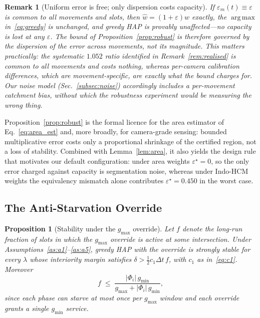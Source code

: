 \documentclass[journal]{IEEEtran}
\newtheorem{proposition}{Proposition}
\newtheorem{remark}{Remark}
\DeclareMathOperator*{\argmax}{arg\,max}
\begin{document}
\begin{remark}[Uniform error is free; only dispersion costs capacity]
\label{rem:dispersion}
If $\varepsilon_m(t) \equiv \varepsilon$ is common to all movements and
slots, then $\hat{w} = (1+\varepsilon) w$ exactly, the $\argmax$
in~\eqref{eq:greedy} is unchanged, and greedy HAP is
\emph{provably unaffected}---no capacity is lost at any $\varepsilon$.
The bound of Proposition~\ref{prop:robust} is therefore governed by the
\emph{dispersion} of the error across movements, not its magnitude. This
matters practically: the systematic $1.052$ ratio identified in
Remark~\ref{rem:realised} is common to all movements and costs nothing,
whereas per-camera calibration differences, which are movement-specific,
are exactly what the bound charges for. Our noise model
(Sec.~\ref{subsec:noise}) accordingly includes a per-movement catchment
bias, without which the robustness experiment would be measuring the
wrong thing.
\end{remark}

Proposition~\ref{prop:robust} is the formal licence for the area
estimator of Eq.~\eqref{eq:area_est} and, more broadly, for camera-grade
sensing: bounded multiplicative error costs only a proportional shrinkage
of the certified region, not a loss of stability. Combined with
Lemma~\ref{lem:area}, it also yields the design rule that motivates our
default configuration: under area weights $\varepsilon^\star=0$, so the
only error charged against capacity is segmentation noise, whereas under
Indo-HCM weights the equivalency mismatch alone contributes
$\varepsilon^\star=0.450$ in the worst case.

\subsection{The Anti-Starvation Override}

\begin{proposition}[Stability under the $g_{\max}$ override]
\label{prop:gmax}
Let $f$ denote the long-run fraction of slots in which the $g_{\max}$
override is active at some intersection. Under
Assumptions~\ref{as:a1}--\ref{as:a5}, greedy HAP with the override is
strongly stable for every $\lambda$ whose interiority margin satisfies
$\delta > \tfrac12 c_1 \Delta t\, f$, with $c_1$ as in~\eqref{eq:c1}.
Moreover
\begin{equation}
f \;\le\; \frac{|\Phi_i|\, g_{\min}}{g_{\max} + |\Phi_i|\, g_{\min}},
\label{eq:fbound}
\end{equation}
since each phase can starve at most once per $g_{\max}$ window and each
override grants a single $g_{\min}$ service.
\end{proposition}
\end{document}

